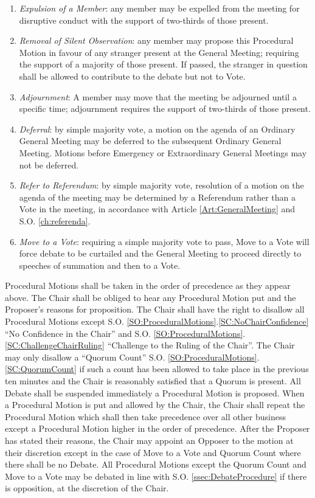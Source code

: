 \begin{enumerate}
\item \label{SC:ExpelMember} \textit{Expulsion of a Member}: any member may be expelled from the meeting for disruptive conduct with the support of two-thirds of those present.
\item \label{SC:RemoveSilentObservation} \textit{Removal of Silent Observation}: any member may propose this Procedural Motion in favour of any stranger present at the General Meeting; requiring the support of a majority of those present. If passed, the stranger in question shall be allowed to contribute to the debate but not to Vote.
\item \label{SC:GMAdjournment} \textit{Adjournment}: A member may move that the meeting be adjourned until a specific time; adjournment requires the support of two-thirds of those present.
\item \label{SC:MotionDeferral} \textit{Deferral}: by simple majority vote, a motion on the agenda of an Ordinary General Meeting may be deferred to the subsequent Ordinary General Meeting. Motions before Emergency or Extraordinary General Meetings may not be deferred.
\item \label{SC:ReferToReferendum} \textit{Refer to Referendum}: by simple majority vote, resolution of a motion on the agenda of the meeting may be determined by a Referendum rather than a Vote in the meeting, in accordance with Article \ref{Art:GeneralMeeting} and S.O. \ref{ch:referenda}.
\item \label{SC:MoveToVote} \textit{Move to a Vote}: requiring a simple majority vote to pass, Move to a Vote will force debate to be curtailed and the General Meeting to proceed directly to speeches of summation and then to a Vote.
\end{enumerate}
\npara Procedural Motions shall be taken in the order of precedence as they appear above.
\npara The Chair shall be obliged to hear any Procedural Motion put and the Proposer's reasons for proposition.
\npara The Chair shall have the right to disallow all Procedural Motions except S.O. \ref{SO:ProceduralMotions}.\ref{SC:NoChairConfidence} ``No Confidence in the Chair'' and S.O. \ref{SO:ProceduralMotions}.\ref{SC:ChallengeChairRuling} ``Challenge to the Ruling of the Chair''. The Chair may only disallow a ``Quorum Count'' S.O. \ref{SO:ProceduralMotions}.\ref{SC:QuorumCount} if such a count has been allowed to take place in the previous ten minutes and the Chair is reasonably satisfied that a Quorum is present.
\npara All Debate shall be suspended immediately a Procedural Motion is proposed.
\npara When a Procedural Motion is put and allowed by the Chair, the Chair shall repeat the Procedural Motion which shall then take precedence over all other business except a Procedural Motion higher in the order of precedence. After the Proposer has stated their reasons, the Chair may appoint an Opposer to the motion at their discretion except in the case of Move to a Vote and Quorum Count where there shall be no Debate. All Procedural Motions except the Quorum Count and Move to a Vote may be debated in line with S.O. \ref{ssec:DebateProcedure} if there is opposition, at the discretion of the Chair.




